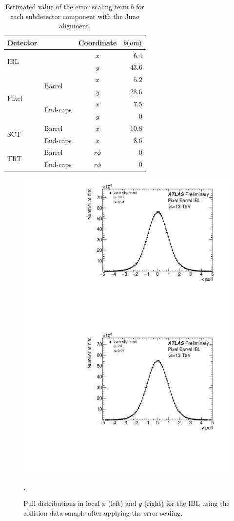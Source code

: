 \begin{table}[htbp]
  \centering
  \begin{tabular}{l l c r}
  Detector & & Coordinate & $b (\mu\textrm{m})$ \\
  \hline\hline
  \multirow{2}{*}{IBL} & & $x$ & $6.4$ \\
                       & & $y$ & $43.6$ \\
  \hline
  \multirow{4}{*}{Pixel} & \multirow{2}{*}{Barrel} & $x$ & $5.2$ \\
                         &                         & $y$ & $28.6$ \\
                         \cline{2-4}
                         & \multirow{2}{*}{End-caps} & $x$ & $7.5$ \\
                         &                         & $y$ & $0$ \\
  \hline
  \multirow{2}{*}{SCT} & Barrel&   $x$ & $10.8$ \\
                       & End-caps& $x$ & $8.6$ \\
  \hline
  \multirow{2}{*}{TRT} & Barrel&   $r\phi$ & $0$ \\
                       & End-caps& $r\phi$ & $0$ \\
  \hline
  \end{tabular}
  \caption{Estimated value of the error scaling term $b$ for each subdetector component with the June alignment.}
  \label{tab:align_error_scaling}
\end{table}

\begin{figure}[htbp]
  \centering
  \includegraphics[width=.48\textwidth]{figs/alignment/align2015/PIXPULLX0}
  \includegraphics[width=.48\textwidth]{figs/alignment/align2015/PIXPULLY0}
  \caption{Pull distributions in local $x$ (left) and $y$ (right) for the IBL using the  collision data sample after applying the error scaling.}
  \label{fig:align_pull_ibl}.
\end{figure}

